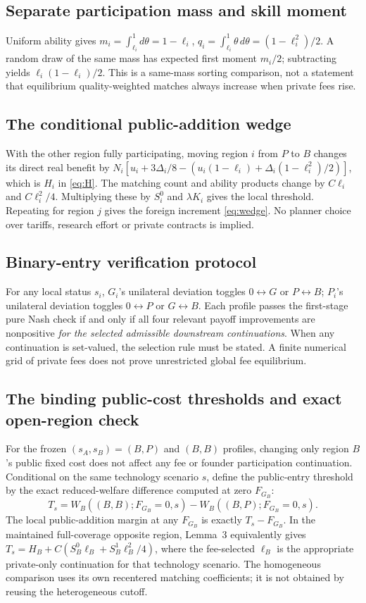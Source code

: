 \subsection{Separate participation mass and skill moment}
Uniform ability gives $m_i=\int_{\ell_i}^1d\theta=1-\ell_i$,
$q_i=\int_{\ell_i}^1\theta\,d\theta=(1-\ell_i^2)/2$. A random draw of the same mass has expected first moment $m_i/2$; subtracting yields $\ell_i(1-\ell_i)/2$. This is a same-mass sorting comparison, not a statement that equilibrium quality-weighted matches always increase when private fees rise.

\subsection{The conditional public-addition wedge}
With the other region fully participating, moving region $i$ from $P$ to $B$ changes its direct real benefit by $N_i[u_i+3\Delta_i/8-(u_i(1-\ell_i)+\Delta_i(1-\ell_i^2)/2)]$, which is $H_i$ in \eqref{eq:H}. The matching count and ability products change by $C\ell_i$ and $C\ell_i^2/4$. Multiplying these by $S_i^0$ and $\lambda K_i$ gives the local threshold. Repeating for region $j$ gives the foreign increment \eqref{eq:wedge}. No planner choice over tariffs, research effort or private contracts is implied.

\subsection{Binary-entry verification protocol}
For any local status $s_i$, $G_i$'s unilateral deviation toggles $0\leftrightarrow G$ or $P\leftrightarrow B$; $P_i$'s unilateral deviation toggles $0\leftrightarrow P$ or $G\leftrightarrow B$. Each profile passes the first-stage pure Nash check if and only if all four relevant payoff improvements are nonpositive \emph{for the selected admissible downstream continuations}. When any continuation is set-valued, the selection rule must be stated. A finite numerical grid of private fees does not prove unrestricted global fee equilibrium.

\subsection{The binding public-cost thresholds and exact open-region check}
For the frozen $(s_A,s_B)=(B,P)$ and $(B,B)$ profiles, changing only region $B$'s public fixed cost does not affect any fee or founder participation continuation. Conditional on the same technology scenario $s$, define the public-entry threshold by the exact reduced-welfare difference computed at zero $F_{G_B}$:
\begin{equation}
 T_s=W_B((B,B);F_{G_B}=0,s)-W_B((B,P);F_{G_B}=0,s).
 \label{eq:exact-public-threshold}
\end{equation}
The local public-addition margin at any $F_{G_B}$ is exactly $T_s-F_{G_B}$. In the maintained full-coverage opposite region, Lemma~3 equivalently gives
$T_s=H_B+C(S_B^0\ell_B+S_B^1\ell_B^2/4)$,
where the fee-selected $\ell_B$ is the appropriate private-only continuation for that technology scenario. The homogeneous comparison uses its own recentered matching coefficients; it is not obtained by reusing the heterogeneous cutoff.

